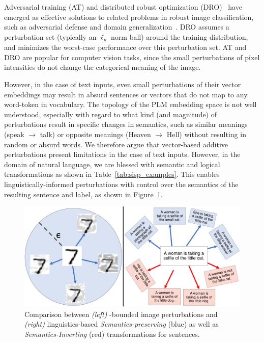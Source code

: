 Adversarial training (AT) and distributed robust optimization (DRO)~\citep{madry2018towards,hu2018does,sinha2017certifying} have emerged as effective solutions to related problems in robust image classification, such as adversarial defense and domain generalization~\citep{volpi2018generalizing}.
DRO assumes a perturbation set (typically an $\ell_p$ norm ball) around the training distribution, and minimizes the worst-case performance over this perturbation set.
AT and DRO are popular for computer vision tasks, since the small perturbations of pixel intensities do not change the categorical meaning of the image.

However, in the case of text inputs, even small perturbations of their vector embeddings may result in absurd sentences or vectors that do not map to any word-token in vocabulary. 
The topology of the PLM embedding space is not well understood, especially with regard to what kind (and magnitude) of perturbations result in specific changes in semantics, such as similar meanings (speak $\rightarrow$ talk) or opposite meanings (Heaven $\rightarrow$ Hell) without resulting in random or absurd words.
We therefore argue that vector-based additive perturbations present limitations in the case of text inputs.
However, in the domain of natural language, we are blessed with semantic and logical transformations as shown in Table~\ref{tab:sisp_examples}.
This enables linguistically-informed perturbations with control over the semantics of the resulting sentence and label, as shown in Figure~\ref{fig:vector_vs_linguistic}.

\begin{figure}
    \centering
    \includegraphics[width=0.95\linewidth]{sdro/images/vector_vs_linguistic.pdf}
    \caption{
    Comparison between \textit{(left)}
    \straightepsilon-bounded image perturbations and \textit{(right)} linguistics-based \textit{Semantics-preserving} (blue) as well as  \textit{Semantics-Inverting} (red) transformations for sentences.
    }
    \label{fig:vector_vs_linguistic}
\end{figure}
    

